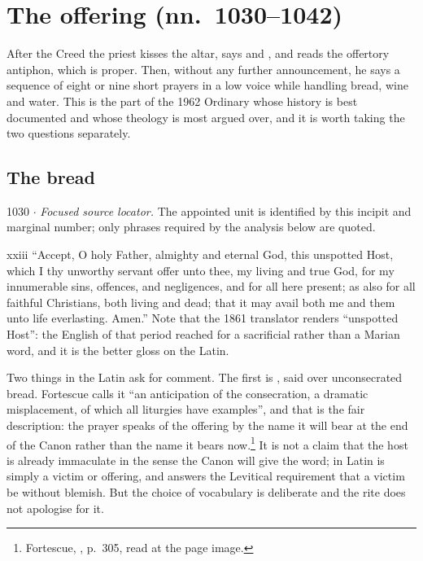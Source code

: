 \section{The offering (nn.~1030--1042)}

After the Creed the priest kisses the altar, says 
and , and reads the offertory antiphon, which is proper. Then,
without any further announcement, he says a sequence of eight or nine short
prayers in a low voice while handling bread, wine and water. This is the part
of the 1962 Ordinary whose history is best documented and whose theology is
most argued over, and it is worth taking the two questions separately.

\subsection*{The bread}

\begin{appointed}{1030 $\cdot$ }
\textit{Focused source locator.} The appointed unit is identified by this incipit and marginal number; only phrases required by the analysis below are quoted.
\end{appointed}

\begin{englishwitness}{xxiii}
``Accept, O holy Father, almighty and eternal God, this unspotted Host, which I
thy unworthy servant offer unto thee, my living and true God, for my
innumerable sins, offences, and negligences, and for all here present; as also
for all faithful Christians, both living and dead; that it may avail both me
and them unto life everlasting. Amen.'' Note that the 1861 translator renders
 ``unspotted Host'': the English of that period
reached for a sacrificial rather than a Marian word, and it is the better
gloss on the Latin.
\end{englishwitness}

Two things in the Latin ask for comment. The first is
, said over unconsecrated bread. Fortescue calls
it ``an anticipation of the consecration, a dramatic misplacement, of which all
liturgies have examples'', and that is the fair description: the prayer speaks
of the offering by the name it will bear at the end of the Canon rather than
the name it bears now.\footnote{Fortescue, , p.~305, read at the
page image.} It is not a claim that the host is already immaculate in the sense
the Canon will give the word;  in Latin is simply a victim or
offering, and  answers the Levitical requirement that a
victim be without blemish. But the choice of vocabulary is deliberate and the
rite does not apologise for it.

